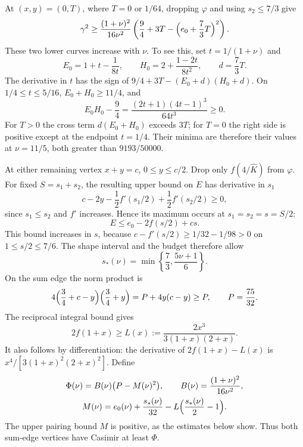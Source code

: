 At $(x,y)=(0,T)$, where $T=0$ or $1/64$, dropping $\varphi$ and using $s_2\le7/3$ give
\[
 \gamma^2\ge\frac{(1+\nu)^2}{16\nu^2}
 \left(\frac94+3T-\Bigl(e_0+\frac73T\Bigr)^2\right).
\]
These two lower curves increase with $\nu$. To see this, set $t=1/(1+\nu)$ and
\[
 E_0=1+t-\frac1{8t},\qquad H_0=2+\frac{1-2t}{8t^2},\qquad d=\frac73T.
\]
The derivative in $t$ has the sign of $9/4+3T-(E_0+d)(H_0+d)$.
On $1/4\le t\le5/16$, $E_0+H_0\ge11/4$, and
\begin{equation}\label{eq:fwd-casimir-monotonicity}
 E_0H_0-\frac94=\frac{(2t+1)(4t-1)^3}{64t^3}\ge0.
\end{equation}
For $T>0$ the cross term $d(E_0+H_0)$ exceeds $3T$;
for $T=0$ the right side is positive except at the endpoint $t=1/4$.
Their minima are therefore their values at $\nu=11/5$, both greater than $9193/50000$.

At either remaining vertex $x+y=c$, $0\le y\le c/2$. Drop only $f(4/\hat K)$ from $\varphi$.
For fixed $S=s_1+s_2$, the resulting upper bound on $E$ has derivative in $s_1$
\[
 c-2y-\frac12f'(s_1/2)+\frac12f'(s_2/2)\ge0,
\]
since $s_1\le s_2$ and $f'$ increases. Hence its maximum occurs at $s_1=s_2=s=S/2$:
\[
 E\le e_0-2f(s/2)+cs.
\]
This bound increases in $s$, because $c-f'(s/2)\ge1/32-1/98>0$ on $1\le s/2\le7/6$.
The shape interval and the budget therefore allow
\[
 s_*(\nu)=\min\left\{\frac73,\frac{5\nu+1}{6}\right\}.
\]
On the sum edge the norm product is
\[
 4\Bigl(\frac34+c-y\Bigr)\Bigl(\frac34+y\Bigr)
 =P+4y(c-y)\ge P,\qquad P=\frac{75}{32}.
\]
The reciprocal integral bound gives
\[
 2f(1+x)\ge L(x):=\frac{2x^3}{3(1+x)(2+x)}.
\]
It also follows by differentiation: the derivative of $2f(1+x)-L(x)$ is
$x^4/[3(1+x)^2(2+x)^2]$. Define
\begin{equation}\label{eq:fwd-casimir-curve}
 \begin{gathered}
 \Phi(\nu)=B(\nu)\bigl(P-M(\nu)^2\bigr),\qquad
 B(\nu)=\frac{(1+\nu)^2}{16\nu^2},\\
 M(\nu)=e_0(\nu)+\frac{s_*(\nu)}{32}
             -L\Bigl(\frac{s_*(\nu)}2-1\Bigr).
 \end{gathered}
\end{equation}
The upper pairing bound $M$ is positive, as the estimates below show.
Thus both sum-edge vertices have Casimir at least $\Phi$.

